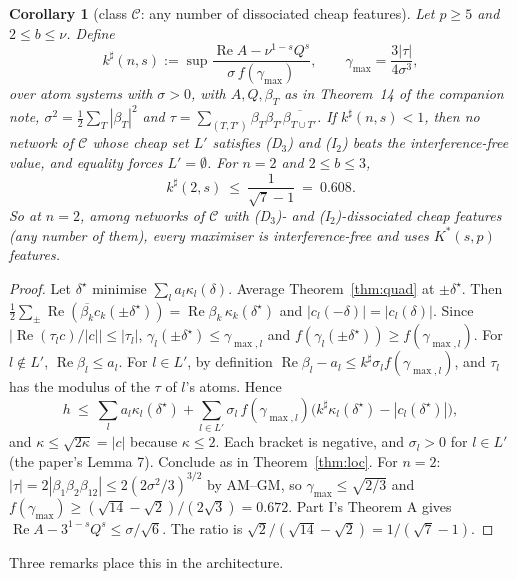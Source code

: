 \documentclass[11pt]{article}
\newtheorem{corollary}[theorem]{Corollary}
\theoremstyle{definition}
\renewcommand{\Re}{\operatorname{Re}}
\begin{document}
\begin{corollary}[class $\mathcal C$: any number of dissociated cheap features]\label{cor:quad}
Let $p\ge5$ and $2\le b\le\nu$.  Define
\[k^\sharp(n,s):=\sup\frac{\Re A-\nu^{1-s}Q^s}{\sigma\,f(\gamma_{\max})},\qquad \gamma_{\max}=\frac{3|\tau|}{4\sigma^3},\]
over atom systems with $\sigma>0$, with $A,Q,\beta_T$ as in Theorem~14 of the companion note, $\sigma^2=\frac12\sum_T|\beta_T|^2$ and
$\tau=\sum_{(T,T')}\beta_T\beta_{T'}\overline{\beta_{T\cup T'}}$.  If $k^\sharp(n,s)<1$, then no network of $\mathcal C$ whose cheap set $L'$ satisfies (D$_3$) and
(I$_2$) beats the interference-free value, and equality forces $L'=\emptyset$.  For $n=2$ and $2\le b\le3$,
\[k^\sharp(2,s)\ \le\ \frac1{\sqrt7-1}\ =\ 0.608 .\]
So at $n=2$, among networks of $\mathcal C$ with (D$_3$)- and (I$_2$)-dissociated cheap features (any number of them), every maximiser is
interference-free and uses $K^*(s,p)$ features.
\end{corollary}
\begin{proof}
Let $\delta^\star$ minimise $\sum_la_l\kappa_l(\delta)$.  Average Theorem~\ref{thm:quad} at $\pm\delta^\star$.  Then $\frac12\sum_\pm\Re(\overline{\beta_k}c_k(\pm\delta^\star))=\Re\beta_k\,\kappa_k(\delta^\star)$
and $|c_l(-\delta)|=|c_l(\delta)|$.  Since $|\Re(\tau_lc)/|c||\le|\tau_l|$, $\gamma_l(\pm\delta^\star)\le\gamma_{\max,l}$ and $f(\gamma_l(\pm\delta^\star))\ge f(\gamma_{\max,l})$.  For
$l\notin L'$, $\Re\beta_l\le a_l$.  For $l\in L'$, by definition $\Re\beta_l-a_l\le k^\sharp\sigma_lf(\gamma_{\max,l})$, and $\tau_l$ has the modulus of the $\tau$ of $l$'s
atoms.  Hence
\[h\ \le\ \sum_la_l\kappa_l(\delta^\star)+\sum_{l\in L'}\sigma_l\,f(\gamma_{\max,l})\big(k^\sharp\kappa_l(\delta^\star)-|c_l(\delta^\star)|\big),\]
and $\kappa\le\sqrt{2\kappa}=|c|$ because $\kappa\le2$.  Each bracket is negative, and $\sigma_l>0$ for $l\in L'$ (the paper's Lemma 7).  Conclude as in
Theorem~\ref{thm:loc}.  For $n=2$: $|\tau|=2|\beta_1\beta_2\beta_{12}|\le2(2\sigma^2/3)^{3/2}$ by AM--GM, so $\gamma_{\max}\le\sqrt{2/3}$ and
$f(\gamma_{\max})\ge(\sqrt{14}-\sqrt2)/(2\sqrt3)=0.672$.  Part I's Theorem A gives $\Re A-3^{1-s}Q^s\le\sigma/\sqrt6$.  The ratio is
$\sqrt2/(\sqrt{14}-\sqrt2)=1/(\sqrt7-1)$.
\end{proof}
Three remarks place this in the architecture.
\end{document}

